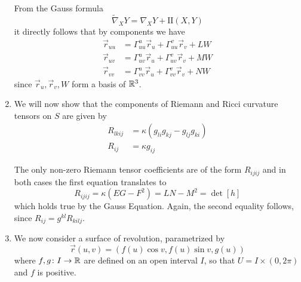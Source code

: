 \documentclass[a4paper, 12pt]{article}
\begin{document}
\begin{Exercise}
\begin{enumerate}[label=(\roman*)]
            From the Gauss formula
            \[
                \tilde{\nabla}_XY = \nabla_XY + \text{II}(X, Y)
            \]
            it directly follows that by components we have
            \begin{align*}
                \vec{r}_{uu} &= \Gamma_{uu}^u\vec{r}_u + \Gamma_{uu}^v\vec{r}_v + LW \\
                \vec{r}_{uv} &= \Gamma_{uv}^u\vec{r}_u + \Gamma_{uv}^v\vec{r}_v + MW \\
                \vec{r}_{vv} &= \Gamma_{vv}^u\vec{r}_u + \Gamma_{vv}^v\vec{r}_v + NW
            \end{align*}
            since $\vec{r}_u,\vec{r}_v,W$ form a basis of $\mathbb{R}^3$.
        \item We will now show that the components of Riemann and Ricci curvature tensors on $S$
            are given by
            \begin{align*}
                R_{lkij} &= \kappa(g_{li}g_{kj} - g_{lj}g_{ki}) \\
                R_{ij} &= \kappa g_{ij}
            \end{align*}
            
            The only non-zero Riemann tensor coefficients are of the form
            $R_{ijij}$ and in both cases the first equation translates to
            \[
                R_{ijij} = \kappa (EG - F^2) = LN - M^2 = \det [h]
            \]
            which holds true by the Gauss Equation.
            Again, the second equality follows, since $R_{ij} = g^{kl}R_{kilj}$.
        \item We now consider a surface of revolution, parametrized by
            \[
                \vec{r}(u, v) = (f(u)\cos v, f(u) \sin v, g(u))
            \]
            where $f, g \colon I \to \mathbb{R}$ are defined on an open interval $I$,
            so that $U = I \times (0, 2\pi)$ and $f$ is positive.


\end{enumerate}
\end{Exercise}
\end{document}
